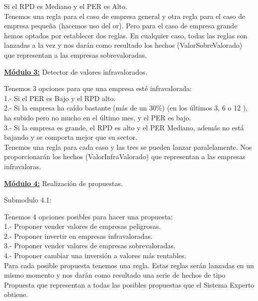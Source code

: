 \documentclass[12pt]{article}
\begin{document}
    Si el RPD es Mediano y el PER es Alto.\\

Tenemos una regla para el caso de empresa general y otra regla para el caso de empresa pequeña (hacemos uso del or). Pero para el caso de empresa grande hemos optados por establecer dos reglas. En cualquier caso, todas las reglas son lanzadas a la vez y nos darán como resultado los hechos (ValorSobreValorado) que representan a las empresas sobrevaloradas.  

\begin{center}
	\underline{\textbf{Módulo 3:}} Detector de valores infravalorados.
\end{center}
Tenemos 3 opciones para que una empresa esté infravalorada:\\
1.- Si el PER es Bajo y el RPD alto.\\
2.- Si la empresa ha caído bastante (más de un 30\%) (en los últimos 3, 6 o 12 ), ha subido pero no mucho en el último mes, y el PER es bajo.\\
3.- Si la empresa es grande, el RPD es alto y el PER Mediano, además no está bajando y se comporta mejor que su sector.\\

Tenemos una regla para cada caso y las tres se pueden lanzar paralelamente. Nos proporcionarán los hechos (ValorInfraValorado) que representan a las empresas infravaloras. \\

\begin{center}
	\underline{\textbf{Módulo 4:}} Realización de propuestas.
\end{center}
\begin{center}
	Submodulo 4.1:
\end{center}
Tenemos 4 opciones posibles para hacer una propuesta:\\
1.- Proponer vender valores de empresas peligrosas.\\
2.- Proponer invertir en empresas infravaloradas.\\
3.- Proponer vender valores de empresas sobrevaloradas.\\
4.- Proponer cambiar una inversión a valores más rentables.\\

Para cada posible propuesta tenemos una regla. Estas reglas serán lanzadas en un mismo momento y nos darán como resultado una serie de hechos de tipo Propuesta que representan a todas las posibles propuestas que el Sistema Experto obtiene. \\
\end{document}
